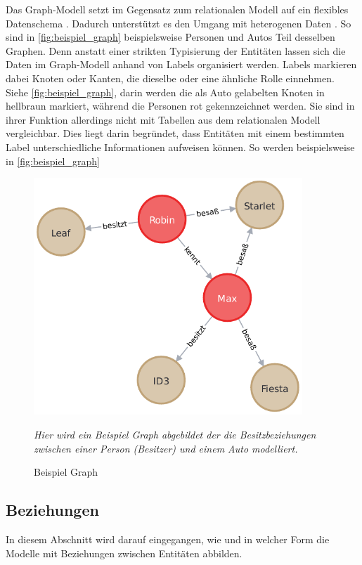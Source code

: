 Das Graph-Modell setzt im Gegensatz zum relationalen Modell auf ein flexibles Datenschema \cite{gdbms}. Dadurch unterstützt es den Umgang mit heterogenen Daten \cite{gdbms}. So sind in \autoref{fig:beispiel_graph} beispielsweise Personen und Autos Teil desselben Graphen. Denn anstatt einer strikten Typisierung der Entitäten lassen sich die Daten im Graph-Modell anhand von Labels organisiert werden. Labels markieren dabei Knoten oder Kanten, die dieselbe oder eine ähnliche Rolle einnehmen. Siehe \autoref{fig:beispiel_graph}, darin werden die als Auto gelabelten Knoten in hellbraun markiert, während die Personen rot gekennzeichnet werden. Sie sind in ihrer Funktion allerdings nicht mit Tabellen aus dem relationalen Modell vergleichbar. Dies liegt darin begründet, dass Entitäten mit einem bestimmten Label unterschiedliche Informationen aufweisen können. So werden beispielsweise in \autoref{fig:beispiel_graph} 

\begin{figure}[h]
    \centering
    \includegraphics[width=0.9\textwidth]{images/example_graph.pdf}
    \caption{Beispiel Graph}
    \vspace{1em}
    \textit{Hier wird ein Beispiel Graph abgebildet der die Besitzbeziehungen zwischen einer Person (Besitzer) und einem Auto modelliert.}
    \label{fig:beispiel_graph}
\end{figure}

\subsection{Beziehungen}
\label{datenmodelle:beziehungen}
In diesem Abschnitt wird darauf eingegangen, wie und in welcher Form die Modelle mit Beziehungen zwischen Entitäten abbilden. 

